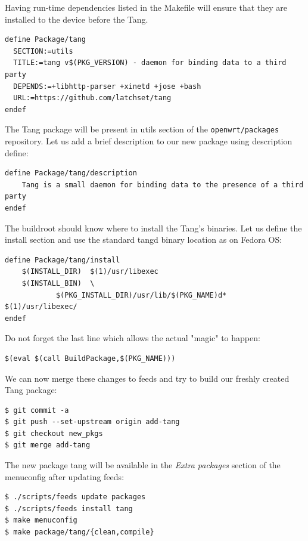 Having run-time dependencies listed in the Makefile will ensure that they are installed to the device before the Tang.
\begin{lstlisting}[columns=fixed,basicstyle=\ttfamily\footnotesize,tabsize=4,backgroundcolor=\color{yellow!10}]
define Package/tang
  SECTION:=utils
  TITLE:=tang v$(PKG_VERSION) - daemon for binding data to a third party
  DEPENDS:=+libhttp-parser +xinetd +jose +bash
  URL:=https://github.com/latchset/tang
endef
\end{lstlisting}
The Tang package will be present in utils section of the {\tt openwrt/packages} repository.
Let us add a brief description to our new package using description define:
\begin{lstlisting}[columns=fixed,basicstyle=\ttfamily\footnotesize,tabsize=4,backgroundcolor=\color{yellow!10}]
define Package/tang/description
	Tang is a small daemon for binding data to the presence of a third party
endef
\end{lstlisting}
The buildroot should know where to install the Tang's binaries.
Let us define the install section and use the standard tangd binary location as on Fedora OS:
\begin{lstlisting}[columns=fixed,basicstyle=\ttfamily\footnotesize,tabsize=4,backgroundcolor=\color{yellow!10}]
define Package/tang/install
	$(INSTALL_DIR)	$(1)/usr/libexec
	$(INSTALL_BIN)	\
			$(PKG_INSTALL_DIR)/usr/lib/$(PKG_NAME)d*	$(1)/usr/libexec/
endef
\end{lstlisting}
Do not forget the last line which allows the actual "magic" to happen:
\begin{lstlisting}[columns=fixed,basicstyle=\ttfamily\footnotesize,tabsize=4,backgroundcolor=\color{yellow!10}]
$(eval $(call BuildPackage,$(PKG_NAME)))
\end{lstlisting}
We can now merge these changes to feeds and try to build our freshly created Tang package:
\begin{lstlisting}[columns=fixed,basicstyle=\ttfamily\footnotesize,tabsize=4,backgroundcolor=\color{yellow!10}]
$ git commit -a
$ git push --set-upstream origin add-tang
$ git checkout new_pkgs
$ git merge add-tang
\end{lstlisting}
The new package tang will be available in the {\it Extra packages} section of the menuconfig after updating feeds:
\begin{lstlisting}[columns=fixed,basicstyle=\ttfamily\footnotesize,tabsize=4,backgroundcolor=\color{yellow!10}]
$ ./scripts/feeds update packages
$ ./scripts/feeds install tang
$ make menuconfig
$ make package/tang/{clean,compile}
\end{lstlisting}
